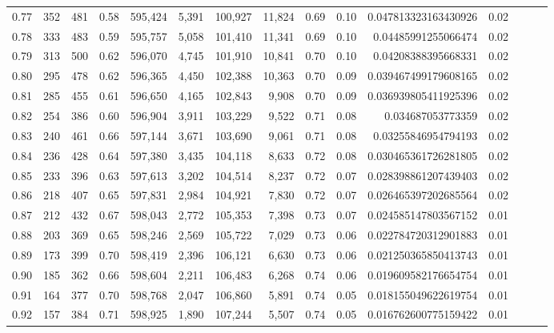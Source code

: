 \begin{tabular}{rrrrrrrrrrrrrrr}
0.77 &     352 &    481 &  0.58 &  595,424 &    5,391 &  100,927 &   11,824 &  0.69 &  0.10 &  0.047813323163430926 &      0.02 \\
0.78 &     333 &    483 &  0.59 &  595,757 &    5,058 &  101,410 &   11,341 &  0.69 &  0.10 &   0.04485991255066474 &      0.02 \\
0.79 &     313 &    500 &  0.62 &  596,070 &    4,745 &  101,910 &   10,841 &  0.70 &  0.10 &   0.04208388395668331 &      0.02 \\
0.80 &     295 &    478 &  0.62 &  596,365 &    4,450 &  102,388 &   10,363 &  0.70 &  0.09 &  0.039467499179608165 &      0.02 \\
0.81 &     285 &    455 &  0.61 &  596,650 &    4,165 &  102,843 &    9,908 &  0.70 &  0.09 &  0.036939805411925396 &      0.02 \\
0.82 &     254 &    386 &  0.60 &  596,904 &    3,911 &  103,229 &    9,522 &  0.71 &  0.08 &     0.034687053773359 &      0.02 \\
0.83 &     240 &    461 &  0.66 &  597,144 &    3,671 &  103,690 &    9,061 &  0.71 &  0.08 &   0.03255846954794193 &      0.02 \\
0.84 &     236 &    428 &  0.64 &  597,380 &    3,435 &  104,118 &    8,633 &  0.72 &  0.08 &  0.030465361726281805 &      0.02 \\
0.85 &     233 &    396 &  0.63 &  597,613 &    3,202 &  104,514 &    8,237 &  0.72 &  0.07 &  0.028398861207439403 &      0.02 \\
0.86 &     218 &    407 &  0.65 &  597,831 &    2,984 &  104,921 &    7,830 &  0.72 &  0.07 &  0.026465397202685564 &      0.02 \\
0.87 &     212 &    432 &  0.67 &  598,043 &    2,772 &  105,353 &    7,398 &  0.73 &  0.07 &  0.024585147803567152 &      0.01 \\
0.88 &     203 &    369 &  0.65 &  598,246 &    2,569 &  105,722 &    7,029 &  0.73 &  0.06 &  0.022784720312901883 &      0.01 \\
0.89 &     173 &    399 &  0.70 &  598,419 &    2,396 &  106,121 &    6,630 &  0.73 &  0.06 &  0.021250365850413743 &      0.01 \\
0.90 &     185 &    362 &  0.66 &  598,604 &    2,211 &  106,483 &    6,268 &  0.74 &  0.06 &  0.019609582176654754 &      0.01 \\
0.91 &     164 &    377 &  0.70 &  598,768 &    2,047 &  106,860 &    5,891 &  0.74 &  0.05 &  0.018155049622619754 &      0.01 \\
0.92 &     157 &    384 &  0.71 &  598,925 &    1,890 &  107,244 &    5,507 &  0.74 &  0.05 &  0.016762600775159422 &      0.01 \\

\end{tabular}
